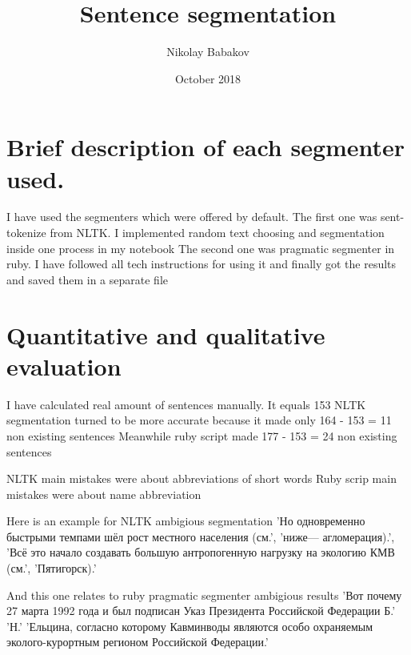 \documentclass{article}
\title{Sentence segmentation}
\author{Nikolay Babakov}
\date{October 2018}
\begin{document}
\maketitle

\section{Brief description of each segmenter used.}
I have used the segmenters which were offered by default. 
The first one was sent-tokenize from NLTK. I implemented random text choosing and segmentation inside one process in my notebook\newline
The second one was pragmatic segmenter in ruby. I have followed all tech instructions for using it and finally got the results and saved them in a separate file\newline

\section{Quantitative and qualitative evaluation}
I have calculated real amount of sentences manually. It equals 153\newline
NLTK segmentation turned to be more accurate because it made only 164 - 153 = 11 non existing sentences\newline
Meanwhile ruby script made 177 - 153 = 24 non existing sentences\newline

NLTK main mistakes were about abbreviations of short words Ruby scrip main mistakes were about name abbreviation\newline

Here is an example for NLTK ambigious segmentation\newline
'Но одновременно быстрыми темпами шёл рост местного населения (см.',\newline
'ниже— агломерация).',\newline
'Всё это начало создавать большую антропогенную нагрузку на экологию КМВ (см.', 'Пятигорск).'\newline

And this one relates to ruby pragmatic segmenter ambigious results\newline
'Вот почему 27 марта 1992 года и был подписан Указ Президента Российской Федерации Б.'\newline
 'Н.'\newline
 'Ельцина, согласно которому Кавминводы являются особо охраняемым эколого-курортным регионом Российской Федерации.'\newline
\end{document}
